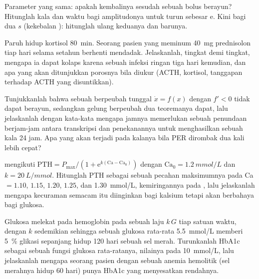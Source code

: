 \begin{exercise}[$\star\star$]\label{exo:b3:endocrinology:8}
Parameter yang sama: apakah kembalinya sesudah sebuah bolus berayun? Hitunglah
kala dan waktu bagi amplitudonya untuk turun sebesar $\mathrm{e}$. Kini bagi dua
$s$ (kekebalan ): hitunglah ulang keduanya dan  barunya.
\end{exercise}

\begin{exercise}[$\star\star$]\label{exo:b3:endocrinology:9}
Paruh hidup kortisol \qty{80}{min}. Seorang pasien yang meminum \qty{40}{mg}
prednisolon tiap hari selama setahun berhenti mendadak. Jelaskanlah, tingkat demi tingkat,
mengapa ia dapat kolaps karena sebuah infeksi ringan tiga hari kemudian, dan
apa yang akan ditunjukkan porosnya bila diukur (ACTH, kortisol, tanggapan terhadap
ACTH yang disuntikkan).
\end{exercise}

\begin{exercise}[$\star\star\star$]\label{exo:b3:endocrinology:10}
Tunjukkanlah bahwa sebuah  berpeubah tunggal $\dot x = f(x)$ dengan $f' < 0$
tidak dapat berayun, sedangkan gelung berpeubah dua teoremanya dapat, lalu
jelaskanlah dengan kata-kata mengapa jamnya memerlukan sebuah penundaan berjam-jam antara
transkripsi dan penekanannya untuk menghasilkan sebuah kala 24 jam. Apa yang akan
terjadi pada kalanya bila PER dirombak dua kali lebih cepat?
\end{exercise}

\begin{exercise}[$\star\star\star$]\label{exo:b3:endocrinology:11}
 mengikuti $\text{PTH} = P_{\max}/(1 +
\mathrm{e}^{k(\text{Ca} - \text{Ca}_{0})})$ dengan $\text{Ca}_{0} =
\qty{1.2}{mmol/L}$ dan $k = \qty{20}{L/mmol}$. Hitunglah PTH sebagai sebuah pecahan
maksimumnya pada Ca $= 1.10$, $1.15$, $1.20$, $1.25$, dan \qty{1.30}{mmol/L},
kemiringannya pada , lalu jelaskanlah mengapa kecuraman semacam itu diinginkan
bagi kalsium tetapi akan berbahaya bagi glukosa.
\end{exercise}

\begin{exercise}[$\star\star\star$]\label{exo:b3:endocrinology:12}
Glukosa melekat pada hemoglobin pada sebuah laju $k\,G$ tiap satuan waktu, dengan
$k$ sedemikian sehingga sebuah glukosa rata-rata \qty{5.5}{mmol/L} memberi \qty{5}{\%}
glikasi sepanjang hidup 120 hari sebuah sel merah. Turunkanlah HbA1c sebagai sebuah fungsi
glukosa rata-ratanya, nilainya pada \qty{10}{mmol/L}, lalu jelaskanlah mengapa seorang pasien
dengan sebuah anemia hemolitik (sel merahnya hidup 60 hari) punya HbA1c yang menyesatkan
rendahnya.
\end{exercise}

